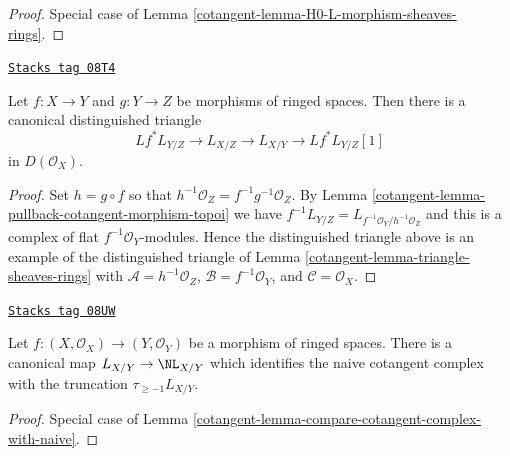 \begin{proof}

Special case of Lemma \ref{cotangent-lemma-H0-L-morphism-sheaves-rings}.
\end{proof}

\begin{lemma}
\label{cotangent-lemma-triangle-ringed-spaces}
\href{https://stacks.math.columbia.edu/tag/08T4}{\texttt{Stacks tag 08T4}}

Let $f : X \to Y$ and $g : Y \to Z$ be morphisms of ringed spaces.
Then there is a canonical distinguished triangle
$$
Lf^* L_{Y/Z} \to L_{X/Z} \to L_{X/Y} \to Lf^*L_{Y/Z}[1]
$$
in $D(\mathcal{O}_X)$.
\end{lemma}

\begin{proof}

Set $h = g \circ f$ so that $h^{-1}\mathcal{O}_Z = f^{-1}g^{-1}\mathcal{O}_Z$.
By Lemma \ref{cotangent-lemma-pullback-cotangent-morphism-topoi} we have
$f^{-1}L_{Y/Z} = L_{f^{-1}\mathcal{O}_Y/h^{-1}\mathcal{O}_Z}$
and this is a complex of flat $f^{-1}\mathcal{O}_Y$-modules.
Hence the distinguished triangle above is an example of the
distinguished triangle of
Lemma \ref{cotangent-lemma-triangle-sheaves-rings}
with $\mathcal{A} = h^{-1}\mathcal{O}_Z$, $\mathcal{B} = f^{-1}\mathcal{O}_Y$,
and $\mathcal{C} = \mathcal{O}_X$.
\end{proof}

\begin{lemma}
\label{cotangent-lemma-compare-cotangent-complex-with-naive-ringed-spaces}
\href{https://stacks.math.columbia.edu/tag/08UW}{\texttt{Stacks tag 08UW}}

Let $f : (X, \mathcal{O}_X) \to (Y, \mathcal{O}_Y)$ be a morphism of
ringed spaces. There is a canonical map $L_{X/Y} \to \NL_{X/Y}$ which
identifies the naive cotangent complex with the truncation
$\tau_{\geq -1}L_{X/Y}$.
\end{lemma}

\begin{proof}

Special case of Lemma \ref{cotangent-lemma-compare-cotangent-complex-with-naive}.
\end{proof}

